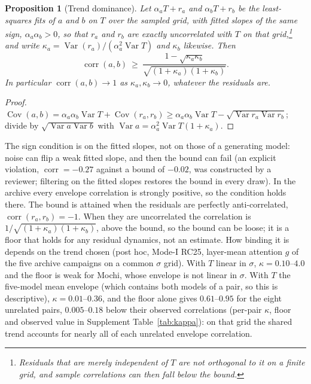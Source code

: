 \documentclass[11pt]{article}
\newtheorem{proposition}[theorem]{Proposition}
\theoremstyle{definition}
\begin{document}
\begin{proposition}[Trend dominance]\label{prop:trend}
Let $\alpha_aT+r_a$ and $\alpha_bT+r_b$ be the least-squares fits of $a$ and $b$ on $T$ over the sampled grid, with fitted slopes of the same sign, $\alpha_a\alpha_b>0$, so that $r_a$ and $r_b$ are exactly uncorrelated with $T$ on that grid,\footnote{Residuals that are merely independent of $T$ are not orthogonal to it on a finite grid, and sample correlations can then fall below the bound.} and write $\kappa_a=\operatorname{Var}(r_a)/(\alpha_a^2\operatorname{Var} T)$ and $\kappa_b$ likewise. Then
\begin{equation}
 \operatorname{corr}(a,b)\ \ge\ \frac{1-\sqrt{\kappa_a\kappa_b}}{\sqrt{(1+\kappa_a)(1+\kappa_b)}} .
\end{equation}
In particular $\operatorname{corr}(a,b)\to1$ as $\kappa_a,\kappa_b\to0$, whatever the residuals are.
\end{proposition}
\begin{proof}
$\operatorname{Cov}(a,b)=\alpha_a\alpha_b\operatorname{Var}T+\operatorname{Cov}(r_a,r_b)\ge\alpha_a\alpha_b\operatorname{Var}T-\sqrt{\operatorname{Var}r_a\operatorname{Var}r_b}$; divide by $\sqrt{\operatorname{Var}a\operatorname{Var}b}$ with $\operatorname{Var}a=\alpha_a^2\operatorname{Var}T(1+\kappa_a)$.
\end{proof}
The sign condition is on the fitted slopes, not on those of a generating model: noise can flip a weak fitted slope, and then the bound can fail (an explicit violation, $\operatorname{corr}=-0.27$ against a bound of $-0.02$, was constructed by a reviewer; filtering on the fitted slopes restores the bound in every draw). In the archive every envelope correlation is strongly positive, so the condition holds there. The bound is attained when the residuals are perfectly anti-correlated, $\operatorname{corr}(r_a,r_b)=-1$. When they are uncorrelated the correlation is $1/\sqrt{(1+\kappa_a)(1+\kappa_b)}$, above the bound, so the bound can be loose; it is a floor that holds for any residual dynamics, not an estimate. How binding it is depends on the trend chosen (post hoc, Mode-I RC25, layer-mean attention $g$ of the five archive campaigns on a common $\sigma$ grid). With $T$ linear in $\sigma$, $\kappa=0.10$--$4.0$ and the floor is weak for Mochi, whose envelope is not linear in $\sigma$. With $T$ the five-model mean envelope (which contains both models of a pair, so this is descriptive), $\kappa=0.01$--$0.36$, and the floor alone gives $0.61$--$0.95$ for the eight unrelated pairs, $0.005$--$0.18$ below their observed correlations (per-pair $\kappa$, floor and observed value in Supplement Table~\ref{tab:kappa}): on that grid the shared trend accounts for nearly all of each unrelated envelope correlation.
\end{document}

